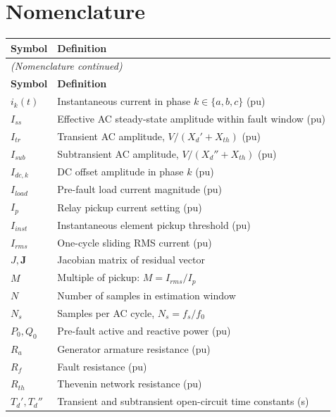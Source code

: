 \documentclass[12pt, a4paper]{article}
\theoremstyle{definition}
\theoremstyle{plain}
\newcommand{\mat}[1]{\mathbf{#1}}
\begin{document}
\newpage
\section*{Nomenclature}

\begin{longtable}{p{3.2cm}p{10cm}}
\toprule
\textbf{Symbol} & \textbf{Definition} \\
\midrule
\endfirsthead
\multicolumn{2}{l}{\textit{(Nomenclature continued)}} \\
\toprule
\textbf{Symbol} & \textbf{Definition} \\
\midrule
\endhead
\bottomrule
\endlastfoot
%
$i_k(t)$       & Instantaneous current in phase $k \in \{a, b, c\}$ (pu) \\
$I_{ss}$       & Effective AC steady-state amplitude within fault window (pu) \\
$I_{tr}$       & Transient AC amplitude, $V/(X_d' + X_{th})$ (pu) \\
$I_{sub}$      & Subtransient AC amplitude, $V/(X_d'' + X_{th})$ (pu) \\
$I_{dc,k}$     & DC offset amplitude in phase $k$ (pu) \\
$I_{load}$     & Pre-fault load current magnitude (pu) \\
$I_p$          & Relay pickup current setting (pu) \\
$I_{inst}$     & Instantaneous element pickup threshold (pu) \\
$I_{rms}$      & One-cycle sliding RMS current (pu) \\
$J, \mat{J}$   & Jacobian matrix of residual vector \\
$M$            & Multiple of pickup: $M = I_{rms}/I_p$ \\
$N$            & Number of samples in estimation window \\
$N_s$          & Samples per AC cycle, $N_s = f_s/f_0$ \\
$P_0, Q_0$     & Pre-fault active and reactive power (pu) \\
$R_a$          & Generator armature resistance (pu) \\
$R_f$          & Fault resistance (pu) \\
$R_{th}$       & Thevenin network resistance (pu) \\
$T_d', T_d''$  & Transient and subtransient open-circuit time constants (s) \\

\end{longtable}
\end{document}
